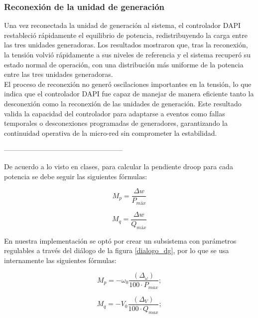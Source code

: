 \subsubsection{Reconexión de la unidad de generación}


Una vez reconectada la unidad de generación al sistema, el controlador DAPI restableció rápidamente el equilibrio de potencia, redistribuyendo la carga entre las tres unidades generadoras. Los resultados mostraron que, tras la reconexión, la tensión volvió rápidamente a sus niveles de referencia y el sistema recuperó su estado normal de operación, con una distribución más uniforme de la potencia entre las tres unidades generadoras.\\

El proceso de reconexión no generó oscilaciones importantes en la tensión, lo que indica que el controlador DAPI fue capaz de manejar de manera eficiente tanto la desconexión como la reconexión de las unidades de generación. Este resultado valida la capacidad del controlador para adaptarse a eventos como fallas temporales o desconexiones programadas de generadores, garantizando la continuidad operativa de la micro-red sin comprometer la estabilidad.

---------------------------------------------------


De acuerdo a lo visto en clases, para calcular la pendiente droop para cada potencia se debe seguir las siguientes fórmulas:

\begin{equation}
    M_p = \frac{\Delta w}{P_{máx}}
\end{equation}

\begin{equation}
    M_q = \frac{\Delta w}{Q_{máx}}
\end{equation}

En nuestra implementación se optó por crear un subsistema con parámetros regulables a través del diálogo de la figura \ref{dialogo_dg}, por lo que se usa internamente las siguientes fórmulas:

\begin{equation*}    
M_p = -\omega_0\frac{(\Delta_\omega)}{100\cdot P_{max}};
\end{equation*}

\begin{equation*}
M_q = -V_0\frac{(\Delta_V)}{100\cdot Q_{max}};
\end{equation*}

